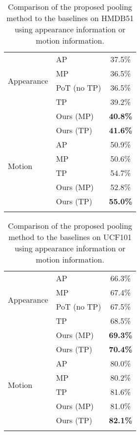\documentclass[journal]{IEEEtran}
\begin{document}
\begin{table}[t!]\normalsize
\caption{Comparison of the proposed pooling method to the baselines on HMDB51 using appearance information or motion information.}
  \centering
  \renewcommand{\arraystretch}{1.2}
    \begin{tabular}{l|p{2.6cm}c}
    \hline
    \multirow{4}{*}{Appearance} & AP & 37.5\% \\
    & MP & 36.5\% \\
    & PoT (no TP) \cite{Ryoo_2015_CVPR} & 36.5\% \\
    & TP & 39.2\% \\
    & Ours (MP) & \textbf{40.8\%} \\
    & Ours (TP) & \textbf{41.6\%}
    \\ \hline \hline
	\multirow{4}{*}{ Motion} & AP & 50.9\% \\
	& MP & 50.6\% \\
    & TP & 54.7\% \\
    & Ours (MP) & 52.8\% \\
    & Ours (TP) & \textbf{55.0\%} \\
    \hline \noalign{\smallskip}
    \end{tabular}%

  \label{baselinetab:HMDB51}%
\end{table}%



\begin{table}[t!]\normalsize
\caption{Comparison of the proposed pooling method to the baselines on UCF101 using appearance information or motion information.}
  \centering
  \renewcommand{\arraystretch}{1.2}
    \begin{tabular}{l|p{2.6cm}c}
    \hline
    \multirow{4}{*}{Appearance} & AP & 66.3\% \\
    & MP & 67.4\% \\
    & PoT (no TP) \cite{Ryoo_2015_CVPR} & 67.5\% \\
    & TP & 68.5\% \\
    & Ours (MP) & \textbf{69.3\%} \\
    & Ours (TP) & \textbf{70.4\%}
    \\ \hline \hline
	\multirow{4}{*}{ Motion} & AP & 80.0\% \\
	& MP & 80.2\% \\
    & TP & 81.6\% \\
    & Ours (MP) & 81.0\% \\
    & Ours (TP) & \textbf{82.1\%} \\
    \hline \noalign{\smallskip}
    \end{tabular}%

  \label{baselinetab:UCF101}%
\end{table}%
\end{document}
